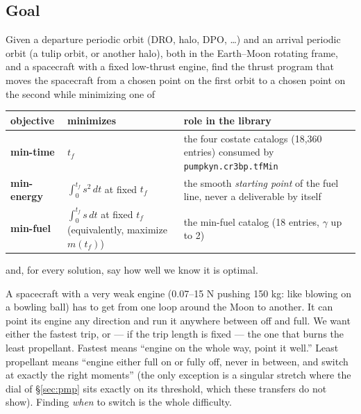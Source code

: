 \documentclass[11pt]{article}
\newcommand{\tf}{t_f}\newcommand{\R}{\mathbb{R}}
\newcommand{\file}[1]{\texttt{#1}}
\begin{document}
\subsection{Goal}
Given a departure periodic orbit (DRO, halo, DPO, \ldots) and an arrival
periodic orbit (a tulip orbit, or another halo), both in the Earth--Moon
rotating frame, and a spacecraft with a fixed low-thrust engine, find the
thrust program that moves the spacecraft from a chosen point on the first
orbit to a chosen point on the second while minimizing one of
\begin{center}
\begin{tabular}{@{}lll@{}}
\toprule
objective & minimizes & role in the library \\
\midrule
\textbf{min-time}  & $\tf$ & the four costate catalogs (18,360 entries) consumed by \file{pumpkyn.cr3bp.tfMin} \\
\textbf{min-energy} & $\int_0^{\tf} s^2\,dt$ at fixed $\tf$ & the smooth \emph{starting point} of the fuel line, never a deliverable by itself \\
\textbf{min-fuel}   & $\int_0^{\tf} s\,dt$ at fixed $\tf$ (equivalently, maximize $m(\tf)$) & the min-fuel catalog (18 entries, $\gamma$ up to 2) \\
\bottomrule
\end{tabular}
\end{center}
and, for every solution, say how well we know it is optimal.

\begin{eli}
A spacecraft with a very weak engine (0.07--15 N pushing 150 kg: like blowing on
a bowling ball) has to get from one loop around the Moon to another. It can
point its engine any direction and run it anywhere between off and full. We
want either the fastest trip, or --- if the trip length is fixed --- the one
that burns the least propellant. Fastest means ``engine on the whole way,
point it well.'' Least propellant means ``engine either full on or fully off,
never in between, and switch at exactly the right moments'' (the only exception is a singular stretch where the dial of \S\ref{sec:pmp} sits exactly on its threshold, which these transfers do not show). Finding \emph{when}
to switch is the whole difficulty.
\end{eli}
\end{document}
